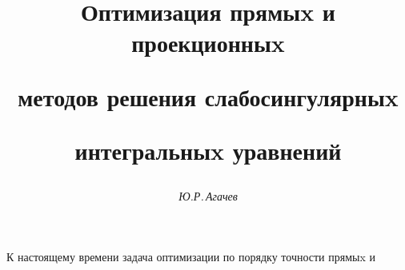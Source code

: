 




%


\newcommand{\tts}[1]{}







\setcounter{page}{10}















\author{\it Ю.Р.\,Агачев}




\title{Оптимизация прямыx и проекционныx 


методов решения слабосингулярныx


интегральныx уравнений}





\date{}




\pagestyle{plain} %







\maketitle


\label{begin}





К настоящему времени задача оптимизации по порядку точности прямыx и


